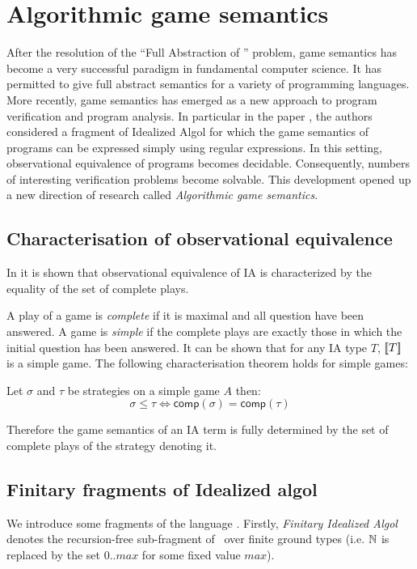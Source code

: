 \section{Algorithmic game semantics}

After the resolution of the ``Full Abstraction of \pcf'' problem,
game semantics has become a very successful paradigm in fundamental
computer science. It has permitted to give full abstract semantics
for a variety of programming languages. More recently, game
semantics has emerged as a new approach to program verification and
program analysis. In particular in the paper \cite{ghicamccusker00},
the authors considered a fragment of Idealized Algol for which the
game semantics of programs can be expressed simply using regular
expressions. In this setting, observational equivalence of programs
becomes decidable. Consequently, numbers of interesting verification
problems become solvable. This development opened up a new direction
of research called \emph{Algorithmic game semantics}.

\subsection{Characterisation of observational equivalence}

In \citep{AM97a} it is shown that observational equivalence of IA is
characterized by the equality of the set of complete plays.

A play of a game is \emph{complete} if it is maximal and all
question have been answered. A game is \emph{simple} if the complete
plays are exactly those in which the initial question has been
answered. It can be shown that for any IA type $T$, ${[\![ T ]\!]}$ is a
simple game. The following characterisation theorem holds for simple
games:
\begin{thm}
Let $\sigma$ and $\tau$ be strategies on a simple game $A$ then:
$$\sigma \leq \tau \iff \textsf{comp}(\sigma) = \textsf{comp}(\tau)$$
\end{thm}
Therefore the game semantics of an IA term is fully determined by
the set of complete plays of the strategy denoting it.

\subsection{Finitary fragments of Idealized algol}
We introduce
some fragments of the language \ialgol. Firstly, \emph{Finitary
Idealized Algol} denotes the recursion-free sub-fragment of \ialgol\
over finite ground types (i.e. $\mathbb{N}$ is replaced by the set $0..max$ for some
fixed value $max$).

